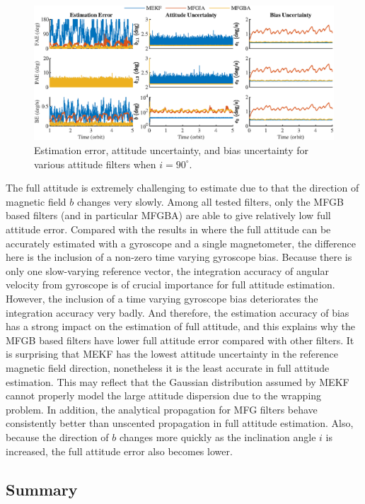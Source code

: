 \begin{figure}
	\centering
	\includegraphics[scale=0.97]{figures/attEst-sim3-error-i90}
	\caption{Estimation error, attitude uncertainty, and bias uncertainty for various attitude filters when $i=90^\circ$.}
	\label{fig:attEst-sim3-error-i90}
\end{figure}

The full attitude is extremely challenging to estimate due to that the direction of magnetic field $b$ changes very slowly.
Among all tested filters, only the MFGB based filters (and in particular MFGBA) are able to give relatively low full attitude error.
Compared with the results in \cite{lee2019spacecraft} where the full attitude can be accurately estimated with a gyroscope and a single magnetometer, the difference here is the inclusion of a non-zero time varying gyroscope bias.
Because there is only one slow-varying reference vector, the integration accuracy of angular velocity from gyroscope is of crucial importance for full attitude estimation.
However, the inclusion of a time varying gyroscope bias deteriorates the integration accuracy very badly.
And therefore, the estimation accuracy of bias has a strong impact on the estimation of full attitude, and this explains why the MFGB based filters have lower full attitude error compared with other filters.
It is surprising that MEKF has the lowest attitude uncertainty in the reference magnetic field direction, nonetheless it is the least accurate in full attitude estimation.
This may reflect that the Gaussian distribution assumed by MEKF cannot properly model the large attitude dispersion due to the wrapping problem.
In addition, the analytical propagation for MFG filters behave consistently better than unscented propagation in full attitude estimation.
Also, because the direction of $b$ changes more quickly as the inclination angle $i$ is increased, the full attitude error also becomes lower.

\subsection{Summary}

